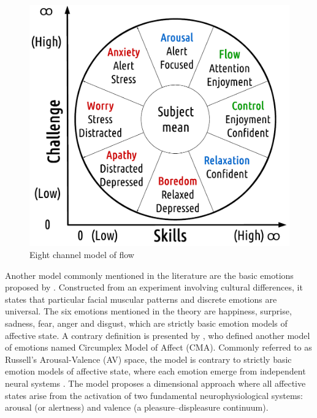 \begin{figure}[h!]
    \centering
    \includegraphics[scale=0.3]{Content/figures/flow-eight.png}
    \caption{Eight channel model of flow \parencite{nakamura2014concept}}
    \label{fig:flow-eight}
\end{figure}

Another model commonly mentioned in the literature are the basic emotions proposed by \textcite{ekman1971constants}. Constructed from an experiment involving cultural differences, it states that particular facial muscular patterns and discrete emotions are universal. The six emotions mentioned in the theory are happiness, surprise, sadness, fear, anger and disgust, which are strictly basic emotion models of affective state. A contrary definition is presented by \textcite{russell1978evidence}, who defined another model of emotions named Circumplex Model of Affect (CMA). Commonly referred to as Russell's Arousal-Valence (AV) space, the model is contrary to strictly basic emotion models of affective state, where each emotion emerge from independent neural systems \parencite{posner2005circumplex}. The model proposes a dimensional approach where all affective states arise from the activation of two fundamental neurophysiological systems: arousal (or alertness) and valence (a pleasure–displeasure continuum).

